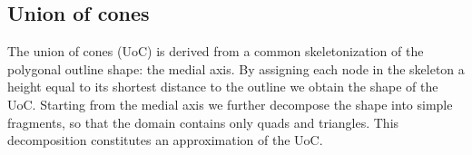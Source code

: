 







\subsection{Union of cones}\label{sec_surface_construction}

The union of cones (UoC) is derived from a common skeletonization of the polygonal outline shape: the medial axis.
By assigning each node in the skeleton a height equal to its shortest distance to the outline we obtain the shape of the UoC.
Starting from the medial axis we further decompose the shape into simple fragments, so that the domain contains only quads and triangles.
This decomposition constitutes an approximation of the UoC. 


